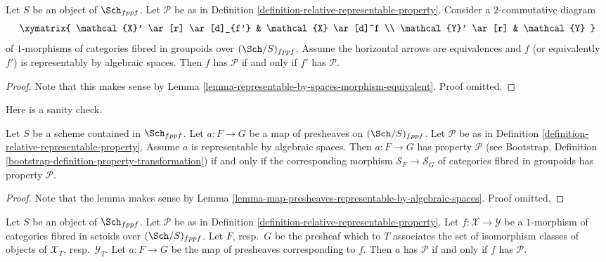 \begin{lemma}
\label{lemma-property-morphism-equivalent}
Let $S$ be an object of $\Sch_{fppf}$.
Let $\mathcal{P}$ be as in
Definition \ref{definition-relative-representable-property}.
Consider a $2$-commutative diagram
$$
\xymatrix{
\mathcal{X}' \ar[r] \ar[d]_{f'} & \mathcal{X} \ar[d]^f \\
\mathcal{Y}' \ar[r] & \mathcal{Y}
}
$$
of $1$-morphisms of categories fibred in groupoids over
$(\Sch/S)_{fppf}$.
Assume the horizontal arrows are equivalences and $f$ (or equivalently $f'$)
is representably by algebraic spaces.
Then $f$ has $\mathcal{P}$ if and only if $f'$ has $\mathcal{P}$.
\end{lemma}

\begin{proof}
Note that this makes sense by
Lemma \ref{lemma-representable-by-spaces-morphism-equivalent}.
Proof omitted.
\end{proof}

\noindent
Here is a sanity check.

\begin{lemma}
\label{lemma-map-presheaves-representable-by-spaces-transformation-property}
Let $S$ be a scheme contained in $\Sch_{fppf}$.
Let $a : F \to G$ be a map of presheaves on $(\Sch/S)_{fppf}$.
Let $\mathcal{P}$ be as in
Definition \ref{definition-relative-representable-property}.
Assume $a$ is representable by algebraic spaces.
Then $a : F \to G$ has property $\mathcal{P}$ (see
Bootstrap, Definition \ref{bootstrap-definition-property-transformation})
if and only if the corresponding morphism
$\mathcal{S}_F \to \mathcal{S}_G$ of categories fibred in groupoids
has property $\mathcal{P}$.
\end{lemma}

\begin{proof}
Note that the lemma makes sense by
Lemma \ref{lemma-map-presheaves-representable-by-algebraic-spaces}.
Proof omitted.
\end{proof}

\begin{lemma}
\label{lemma-map-fibred-setoids-property}
Let $S$ be an object of $\Sch_{fppf}$. Let $\mathcal{P}$ be as in
Definition \ref{definition-relative-representable-property}.
Let $f : \mathcal{X} \to \mathcal{Y}$ be a $1$-morphism of
categories fibred in setoids over $(\Sch/S)_{fppf}$.
Let $F$, resp.\ $G$ be the presheaf which to $T$ associates
the set of isomorphism classes of objects of
$\mathcal{X}_T$, resp.\ $\mathcal{Y}_T$.
Let $a : F \to G$ be the map of presheaves corresponding to $f$.
Then $a$ has $\mathcal{P}$ if and only if $f$ has $\mathcal{P}$.
\end{lemma}

